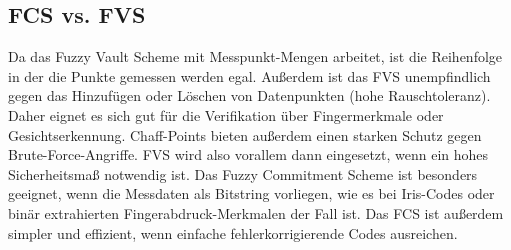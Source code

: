 \subsection{FCS vs. FVS}
Da das Fuzzy Vault Scheme mit Messpunkt-Mengen arbeitet, ist die Reihenfolge in der die Punkte gemessen werden
egal. Außerdem ist das FVS unempfindlich gegen das Hinzufügen oder Löschen von Datenpunkten (hohe Rauschtoleranz). 
Daher eignet es sich gut für die Verifikation über Fingermerkmale oder Gesichtserkennung. Chaff-Points bieten außerdem einen starken Schutz gegen
Brute-Force-Angriffe. FVS wird also vorallem dann eingesetzt, wenn ein hohes Sicherheitsmaß notwendig ist. 
Das Fuzzy Commitment Scheme ist besonders geeignet, wenn die Messdaten als Bitstring vorliegen, wie es bei Iris-Codes 
oder binär extrahierten Fingerabdruck-Merkmalen der Fall ist. Das FCS ist außerdem simpler und effizient,
wenn einfache fehlerkorrigierende Codes ausreichen.